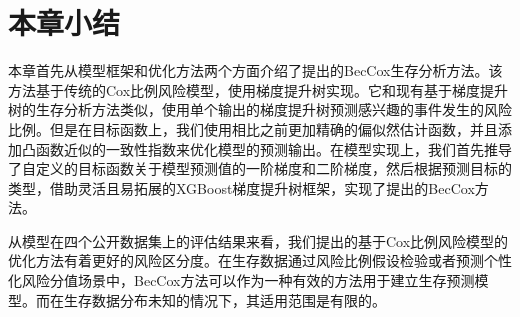 \section{本章小结}

本章首先从模型框架和优化方法两个方面介绍了提出的BecCox生存分析方法。该方法基于传统的Cox比例风险模型，使用梯度提升树实现。它和现有基于梯度提升树的生存分析方法类似，使用单个输出的梯度提升树预测感兴趣的事件发生的风险比例。但是在目标函数上，我们使用相比之前更加精确的偏似然估计函数，并且添加凸函数近似的一致性指数来优化模型的预测输出。在模型实现上，我们首先推导了自定义的目标函数关于模型预测值的一阶梯度和二阶梯度，然后根据预测目标的类型，借助灵活且易拓展的XGBoost梯度提升树框架，实现了提出的BecCox方法。

从模型在四个公开数据集上的评估结果来看，我们提出的基于Cox比例风险模型的优化方法有着更好的风险区分度。在生存数据通过风险比例假设检验或者预测个性化风险分值场景中，BecCox方法可以作为一种有效的方法用于建立生存预测模型。而在生存数据分布未知的情况下，其适用范围是有限的。
